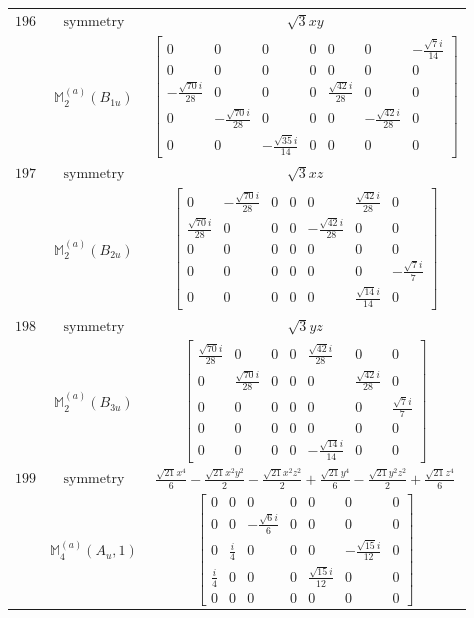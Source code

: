 \documentclass[fleqn,8pt,landscape]{jsarticle}
\begin{document}
\begin{longtable}{ccc}
$ 196 $ & $ \text{symmetry} $ & $ \sqrt{3} x y $ \\
$  $ & $ \mathbb{M}_{2}^{(a)}(B_{1u}) $ & $ \begin{bmatrix} 0 & 0 & 0 & 0 & 0 & 0 & - \frac{\sqrt{7} i}{14} \\ 0 & 0 & 0 & 0 & 0 & 0 & 0 \\ - \frac{\sqrt{70} i}{28} & 0 & 0 & 0 & \frac{\sqrt{42} i}{28} & 0 & 0 \\ 0 & - \frac{\sqrt{70} i}{28} & 0 & 0 & 0 & - \frac{\sqrt{42} i}{28} & 0 \\ 0 & 0 & - \frac{\sqrt{35} i}{14} & 0 & 0 & 0 & 0 \end{bmatrix} $ \\ \hline
$ 197 $ & $ \text{symmetry} $ & $ \sqrt{3} x z $ \\
$  $ & $ \mathbb{M}_{2}^{(a)}(B_{2u}) $ & $ \begin{bmatrix} 0 & - \frac{\sqrt{70} i}{28} & 0 & 0 & 0 & \frac{\sqrt{42} i}{28} & 0 \\ \frac{\sqrt{70} i}{28} & 0 & 0 & 0 & - \frac{\sqrt{42} i}{28} & 0 & 0 \\ 0 & 0 & 0 & 0 & 0 & 0 & 0 \\ 0 & 0 & 0 & 0 & 0 & 0 & - \frac{\sqrt{7} i}{7} \\ 0 & 0 & 0 & 0 & 0 & \frac{\sqrt{14} i}{14} & 0 \end{bmatrix} $ \\ \hline
$ 198 $ & $ \text{symmetry} $ & $ \sqrt{3} y z $ \\
$  $ & $ \mathbb{M}_{2}^{(a)}(B_{3u}) $ & $ \begin{bmatrix} \frac{\sqrt{70} i}{28} & 0 & 0 & 0 & \frac{\sqrt{42} i}{28} & 0 & 0 \\ 0 & \frac{\sqrt{70} i}{28} & 0 & 0 & 0 & \frac{\sqrt{42} i}{28} & 0 \\ 0 & 0 & 0 & 0 & 0 & 0 & \frac{\sqrt{7} i}{7} \\ 0 & 0 & 0 & 0 & 0 & 0 & 0 \\ 0 & 0 & 0 & 0 & - \frac{\sqrt{14} i}{14} & 0 & 0 \end{bmatrix} $ \\ \hline
$ 199 $ & $ \text{symmetry} $ & $ \frac{\sqrt{21} x^{4}}{6} - \frac{\sqrt{21} x^{2} y^{2}}{2} - \frac{\sqrt{21} x^{2} z^{2}}{2} + \frac{\sqrt{21} y^{4}}{6} - \frac{\sqrt{21} y^{2} z^{2}}{2} + \frac{\sqrt{21} z^{4}}{6} $ \\
$  $ & $ \mathbb{M}_{4}^{(a)}(A_{u},1) $ & $ \begin{bmatrix} 0 & 0 & 0 & 0 & 0 & 0 & 0 \\ 0 & 0 & - \frac{\sqrt{6} i}{6} & 0 & 0 & 0 & 0 \\ 0 & \frac{i}{4} & 0 & 0 & 0 & - \frac{\sqrt{15} i}{12} & 0 \\ \frac{i}{4} & 0 & 0 & 0 & \frac{\sqrt{15} i}{12} & 0 & 0 \\ 0 & 0 & 0 & 0 & 0 & 0 & 0 \end{bmatrix} $ \\ \hline

\end{longtable}
\end{document}
